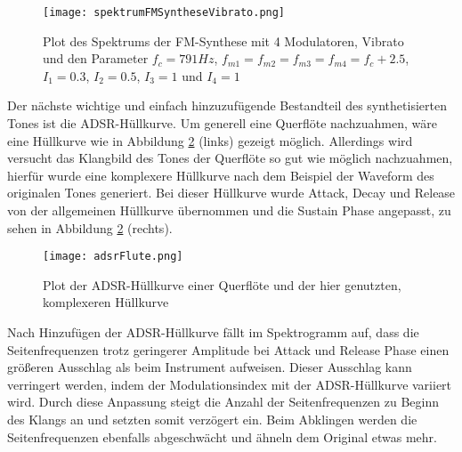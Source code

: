 \begin{figure} [ht]
\centering
  \texttt{[image: spektrumFMSyntheseVibrato.png]}
\caption{Plot des Spektrums der FM-Synthese mit 4 Modulatoren, Vibrato und den Parameter $f_c = 791 Hz$, $f_{m1} = f_{m2} = f_{m3} = f_{m4} = f_c + 2.5$, $I_1 = 0.3$, $I_2 = 0.5$, $I_3 = 1$ und $I_4 = 1$}
\label{fig:spektrumFMSyntheseVibrato}
\end{figure}

Der nächste wichtige und einfach hinzuzufügende Bestandteil des synthetisierten Tones ist die ADSR-Hüllkurve. Um generell eine Querflöte nachzuahmen, wäre eine Hüllkurve wie in Abbildung \ref{fig:adsrFlute} (links) gezeigt möglich. Allerdings wird versucht das Klangbild des Tones der Querflöte so gut wie möglich nachzuahmen, hierfür wurde eine komplexere Hüllkurve nach dem Beispiel der Waveform des originalen Tones generiert. Bei dieser Hüllkurve wurde Attack, Decay und Release von der allgemeinen Hüllkurve übernommen und die Sustain Phase angepasst, zu sehen in Abbildung \ref{fig:adsrFlute} (rechts). 

\begin{figure} [ht]
\centering
  \texttt{[image: adsrFlute.png]}
\caption{Plot der ADSR-Hüllkurve einer Querflöte und der hier genutzten, komplexeren Hüllkurve}
\label{fig:adsrFlute}
\end{figure}

Nach Hinzufügen der ADSR-Hüllkurve fällt im Spektrogramm auf, dass die Seitenfrequenzen trotz geringerer Amplitude bei Attack und Release Phase einen größeren Ausschlag als beim Instrument aufweisen. Dieser Ausschlag kann verringert werden, indem der Modulationsindex mit der ADSR-Hüllkurve variiert wird. Durch diese Anpassung steigt die Anzahl der Seitenfrequenzen zu Beginn des Klangs an und setzten somit verzögert ein. Beim Abklingen werden die Seitenfrequenzen ebenfalls abgeschwächt und ähneln dem Original etwas mehr.

